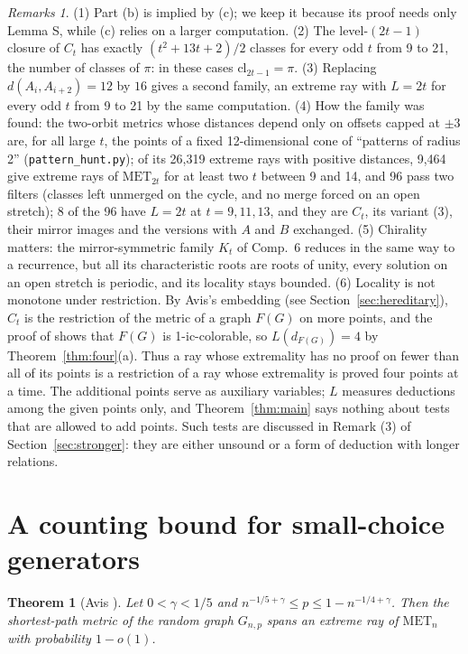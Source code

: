 \documentclass[11pt,a4paper]{article}
\newtheorem*{avis}{Theorem}
\theoremstyle{definition}
\theoremstyle{remark}
\newtheorem*{remarks}{Remarks}
\newcommand{\MET}{\mathrm{MET}}
\newcommand{\cl}{\mathrm{cl}}
\newcommand{\file}[1]{\texttt{#1}}
\begin{document}
\begin{remarks}
(1) Part (b) is implied by (c); we keep it because its proof needs only Lemma S, while (c) relies on a larger
computation.
(2) The level-$(2t - 1)$ closure of $C_t$ has exactly $(t^2 + 13t + 2)/2$ classes for every odd $t$ from 9 to 21,
the number of classes of $\pi$: in these cases $\cl_{2t-1} = \pi$.
(3) Replacing $d(A_i, A_{i+2}) = 12$ by $16$ gives a second family, an extreme ray with $L = 2t$ for every odd $t$
from 9 to 21 by the same computation.
(4) How the family was found: the two-orbit metrics whose distances depend only on offsets capped at $\pm 3$ are,
for all large $t$, the points of a fixed 12-dimensional cone of ``patterns of radius 2'' (\file{pattern\_hunt.py});
of its 26,319 extreme rays with positive distances, 9,464 give extreme rays of $\MET_{2t}$ for at least two $t$
between 9 and 14, and 96 pass two filters (classes left unmerged on the cycle, and no merge forced on an open
stretch); 8 of the 96 have $L = 2t$ at $t = 9, 11, 13$, and they are $C_t$, its variant (3), their mirror images
and the versions with $A$ and $B$ exchanged.
(5) Chirality matters: the mirror-symmetric family $K_t$ of Comp.~6 reduces in the same way to a recurrence, but all its
characteristic roots are roots of unity, every solution on an open stretch is periodic, and its locality stays
bounded.
(6) Locality is not monotone under restriction. By Avis's embedding (see Section~\ref{sec:hereditary}), $C_t$ is
the restriction of the metric of a graph $F(G)$ on more points, and the proof of \cite[Lemma 3.4]{A80} shows that
$F(G)$ is 1-ic-colorable, so $L(d_{F(G)}) = 4$ by Theorem~\ref{thm:four}(a). Thus a ray whose extremality has no
proof on fewer than all of its points is a restriction of a ray whose extremality is proved four points at a time.
The additional points serve as auxiliary variables; $L$ measures deductions among the given points only, and
Theorem~\ref{thm:main} says nothing about tests that are allowed to add points. Such tests are discussed in
Remark (3) of Section~\ref{sec:stronger}: they are either unsound or a form of deduction with longer relations.
\end{remarks}

\section{A counting bound for small-choice generators}

\begin{avis}[Avis {\cite[Thm 3.3]{A80}}]
Let $0 < \gamma < 1/5$ and $n^{-1/5+\gamma} \le p \le 1 - n^{-1/4+\gamma}$. Then the shortest-path metric of
the random graph $G_{n,p}$ spans an extreme ray of $\MET_n$ with probability $1 - o(1)$.
\end{avis}
\end{document}
